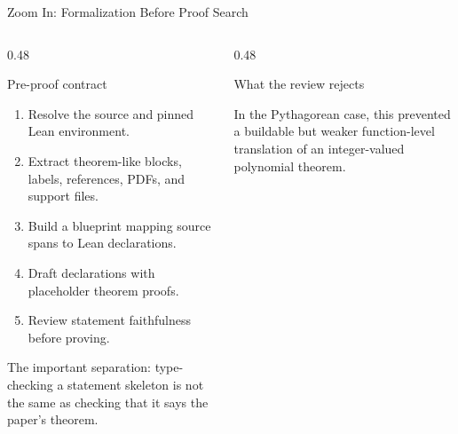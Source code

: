 \documentclass[aspectratio=169,10pt]{beamer}
\begin{document}
\begin{frame}{Zoom In: Formalization Before Proof Search}
\begin{columns}[T,onlytextwidth]
  \begin{column}{0.48\textwidth}
    \begin{block}{Pre-proof contract}
      \small
      \begin{enumerate}
        \item Resolve the source and pinned Lean environment.
        \item Extract theorem-like blocks, labels, references, PDFs, and support files.
        \item Build a blueprint mapping source spans to Lean declarations.
        \item Draft declarations with placeholder theorem proofs.
        \item Review statement faithfulness before proving.
      \end{enumerate}
    \end{block}
    \vspace{1mm}
    \small
    The important separation: \alert{type-checking a statement skeleton is not the same as
    checking that it says the paper's theorem}.
  \end{column}
  \begin{column}{0.48\textwidth}
    \begin{block}{What the review rejects}
      \footnotesize
      \setlength{\tabcolsep}{2.2pt}
    \end{block}
    \vspace{1mm}
    \small
    In the Pythagorean case, this prevented a buildable but weaker
    function-level translation of an integer-valued polynomial theorem.
  \end{column}
\end{columns}
\end{frame}
\end{document}
